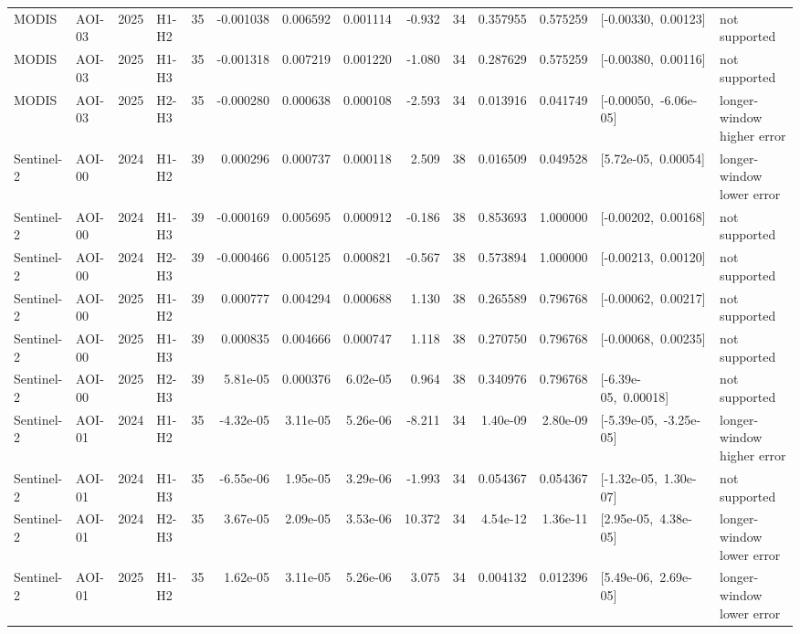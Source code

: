 \begin{landscape}
\begin{longtable}{llclrrrrrrrrp{2.35cm}p{1.75cm}}
MODIS & AOI-03 & 2025 & H1-H2 & 35 & -0.001038 & 0.006592 & 0.001114 & -0.932 & 34 & 0.357955 & 0.575259 & \mbox{[-0.00330, 0.00123]} & not supported \\
MODIS & AOI-03 & 2025 & H1-H3 & 35 & -0.001318 & 0.007219 & 0.001220 & -1.080 & 34 & 0.287629 & 0.575259 & \mbox{[-0.00380, 0.00116]} & not supported \\
MODIS & AOI-03 & 2025 & H2-H3 & 35 & -0.000280 & 0.000638 & 0.000108 & -2.593 & 34 & 0.013916 & 0.041749 & \mbox{[-0.00050, -6.06e-05]} & longer-window higher error \\
Sentinel-2 & AOI-00 & 2024 & H1-H2 & 39 & 0.000296 & 0.000737 & 0.000118 & 2.509 & 38 & 0.016509 & 0.049528 & \mbox{[5.72e-05, 0.00054]} & longer-window lower error \\
Sentinel-2 & AOI-00 & 2024 & H1-H3 & 39 & -0.000169 & 0.005695 & 0.000912 & -0.186 & 38 & 0.853693 & 1.000000 & \mbox{[-0.00202, 0.00168]} & not supported \\
Sentinel-2 & AOI-00 & 2024 & H2-H3 & 39 & -0.000466 & 0.005125 & 0.000821 & -0.567 & 38 & 0.573894 & 1.000000 & \mbox{[-0.00213, 0.00120]} & not supported \\
Sentinel-2 & AOI-00 & 2025 & H1-H2 & 39 & 0.000777 & 0.004294 & 0.000688 & 1.130 & 38 & 0.265589 & 0.796768 & \mbox{[-0.00062, 0.00217]} & not supported \\
Sentinel-2 & AOI-00 & 2025 & H1-H3 & 39 & 0.000835 & 0.004666 & 0.000747 & 1.118 & 38 & 0.270750 & 0.796768 & \mbox{[-0.00068, 0.00235]} & not supported \\
Sentinel-2 & AOI-00 & 2025 & H2-H3 & 39 & 5.81e-05 & 0.000376 & 6.02e-05 & 0.964 & 38 & 0.340976 & 0.796768 & \mbox{[-6.39e-05, 0.00018]} & not supported \\
Sentinel-2 & AOI-01 & 2024 & H1-H2 & 35 & -4.32e-05 & 3.11e-05 & 5.26e-06 & -8.211 & 34 & 1.40e-09 & 2.80e-09 & \mbox{[-5.39e-05, -3.25e-05]} & longer-window higher error \\
Sentinel-2 & AOI-01 & 2024 & H1-H3 & 35 & -6.55e-06 & 1.95e-05 & 3.29e-06 & -1.993 & 34 & 0.054367 & 0.054367 & \mbox{[-1.32e-05, 1.30e-07]} & not supported \\
Sentinel-2 & AOI-01 & 2024 & H2-H3 & 35 & 3.67e-05 & 2.09e-05 & 3.53e-06 & 10.372 & 34 & 4.54e-12 & 1.36e-11 & \mbox{[2.95e-05, 4.38e-05]} & longer-window lower error \\
Sentinel-2 & AOI-01 & 2025 & H1-H2 & 35 & 1.62e-05 & 3.11e-05 & 5.26e-06 & 3.075 & 34 & 0.004132 & 0.012396 & \mbox{[5.49e-06, 2.69e-05]} & longer-window lower error \\

\end{longtable}
\end{landscape}
